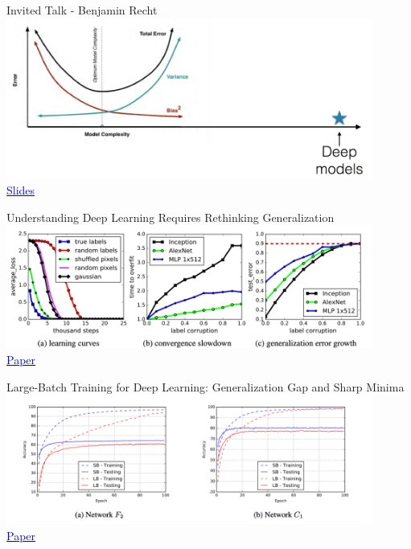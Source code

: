 \documentclass[]{beamer}
\begin{document}
\begin{frame}{Invited Talk - Benjamin Recht}
\centering
\includegraphics[width=0.9\textwidth]{figures/recht-bias-variance-conundrum} \\
\href{http://iclr.cc/lib/exe/fetch.php?media=iclr2017:recht\_iclr2017.pdf}{\textcolor{blue}{Slides}}
\end{frame}

\begin{frame}{Understanding Deep Learning Requires Rethinking Generalization}
\centering
\includegraphics[width=0.9\textwidth]{figures/zhang-learning-curves} \\
\href{http://openreview.net/forum?id=Sy8gdB9xx&noteId=Sy8gdB9xx}{\textcolor{blue}{Paper}}
\end{frame}


\begin{frame}{Large-Batch Training for Deep Learning: Generalization Gap and Sharp Minima}
\centering
\includegraphics[width=0.9\textwidth]{figures/keskar-learning-curves-concept} \\
\href{https://openreview.net/forum?id=H1oyRlYgg&noteId=H1oyRlYgg}{\textcolor{blue}{Paper}}
\end{frame}
\end{document}
